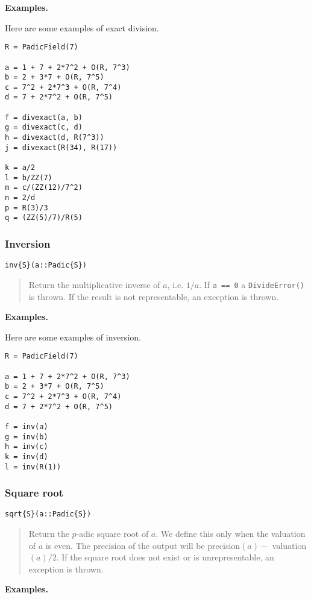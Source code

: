 \documentclass[a4paper,10pt]{article}
\newcommand{\code}{\lstinline}
\newcommand{\desc}[1]{\vspace{-3mm}\begin{quote}#1\end{quote}}
\begin{document}
{{\textbf{Examples.}

Here are some examples of exact division.

\begin{lstlisting}
R = PadicField(7)

a = 1 + 7 + 2*7^2 + O(R, 7^3)
b = 2 + 3*7 + O(R, 7^5)
c = 7^2 + 2*7^3 + O(R, 7^4)
d = 7 + 2*7^2 + O(R, 7^5)

f = divexact(a, b)
g = divexact(c, d)
h = divexact(d, R(7^3))
j = divexact(R(34), R(17))

k = a/2
l = b/ZZ(7)
m = c/(ZZ(12)/7^2)
n = 2/d
p = R(3)/3
q = (ZZ(5)/7)/R(5)
\end{lstlisting}

\subsubsection{Inversion}

\begin{lstlisting}
inv{S}(a::Padic{S})
\end{lstlisting}

\desc{Return the multiplicative inverse of $a$, i.e. $1/a$. If \code{a == 0}
a \code{DivideError()} is thrown. If the result is not representable, an
exception is thrown.}

\textbf{Examples.}

Here are some examples of inversion.

\begin{lstlisting}
R = PadicField(7)

a = 1 + 7 + 2*7^2 + O(R, 7^3)
b = 2 + 3*7 + O(R, 7^5)
c = 7^2 + 2*7^3 + O(R, 7^4)
d = 7 + 2*7^2 + O(R, 7^5)

f = inv(a)
g = inv(b)
h = inv(c)
k = inv(d)
l = inv(R(1))
\end{lstlisting}

\subsubsection{Square root}

\begin{lstlisting}
sqrt{S}(a::Padic{S})
\end{lstlisting}

\desc{Return the $p$-adic square root of $a$. We define this only when the
valuation of $a$ is even. The precision of the output will be precision$(a) -$
valuation$(a)/2$. If the square root does not exist or is unrepresentable, an
exception is thrown.}

\textbf{Examples.}

}}
\end{document}
